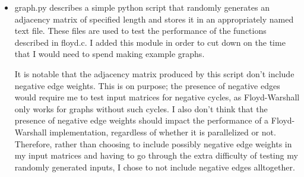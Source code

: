 \documentclass[]{article}
\begin{document}
	\begin{itemize}
		\item graph.py describes a simple python script that randomly generates an adjacency matrix of specified length and stores it in an appropriately named text file. These files are used to test the performance of the functions described in floyd.c. I added this module in order to cut down on the time that I would need to spend making example graphs. 
		
		It is notable that the adjacency matrix produced by this script don't include negative edge weights. This is on purpose; the presence of negative edges would require me to test input matrices for negative cycles, as Floyd-Warshall only works for graphs without such cycles. I also don't think that the presence of negative edge weights should impact the performance of a Floyd-Warshall implementation, regardless of whether it is parallelized or not. Therefore, rather than choosing to include possibly negative edge weights in my input matrices and having to go through the extra difficulty of testing my randomly generated inputs, I chose to not include negative edges alltogether.
		

\end{itemize}
\end{document}
